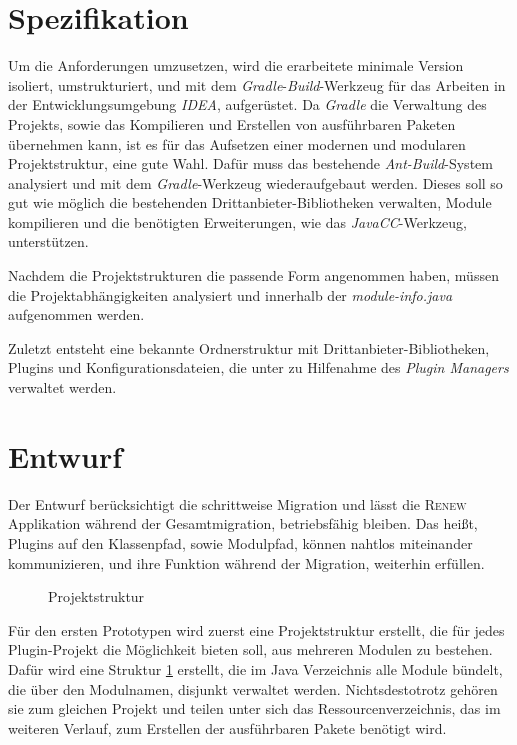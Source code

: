 \section{Spezifikation}
	Um die Anforderungen umzusetzen, wird die erarbeitete minimale Version isoliert, umstrukturiert, und mit dem \textit{Gradle}-\textit{Build}-Werkzeug für das Arbeiten in der Entwicklungsumgebung \textit{IDEA}, aufgerüstet. Da \textit{Gradle} die Verwaltung des Projekts, sowie das Kompilieren und Erstellen von ausführbaren Paketen übernehmen kann, ist es für das Aufsetzen einer modernen und modularen Projektstruktur, eine gute Wahl.\newline
	Dafür muss das bestehende \textit{Ant-Build}-System analysiert und mit dem \textit{Gradle}-Werkzeug wiederaufgebaut werden. Dieses soll so gut wie möglich die bestehenden Drittanbieter-Bibliotheken verwalten, Module kompilieren und die benötigten Erweiterungen, wie das \textit{JavaCC}-Werkzeug, unterstützen.\bigbreak

	Nachdem die Projektstrukturen die passende Form angenommen haben, müssen die Projektabhängigkeiten analysiert und innerhalb der \textit{module-info.java} aufgenommen werden.\bigbreak

	Zuletzt entsteht eine bekannte Ordnerstruktur mit Drittanbieter-Bibliotheken, Plugins und Konfigurationsdateien, die unter zu Hilfenahme des \textit{Plugin Managers} verwaltet werden.

\section{Entwurf}
	Der Entwurf berücksichtigt die schrittweise Migration und lässt die \textsc{Renew} Applikation während der Gesamtmigration, betriebsfähig bleiben. Das heißt, Plugins auf den Klassenpfad, sowie Modulpfad, können nahtlos miteinander kommunizieren, und ihre Funktion während der Migration, weiterhin erfüllen.\bigbreak

	\begin{figure}[h!]
		\centering
		\begin{minipage}{7cm}
		\end{minipage}
		\caption{Projektstruktur}
		\label{fig:projektstruktur}
	\end{figure}
	Für den ersten Prototypen wird zuerst eine Projektstruktur erstellt, die für jedes Plugin-Projekt die Möglichkeit bieten soll, aus mehreren Modulen zu bestehen. Dafür wird eine Struktur \ref{fig:projektstruktur} erstellt, die im Java Verzeichnis alle Module bündelt, die über den Modulnamen, disjunkt verwaltet werden. Nichtsdestotrotz gehören sie zum gleichen Projekt und teilen unter sich das Ressourcenverzeichnis, das im weiteren Verlauf, zum Erstellen der ausführbaren Pakete benötigt wird.\bigbreak
	       
